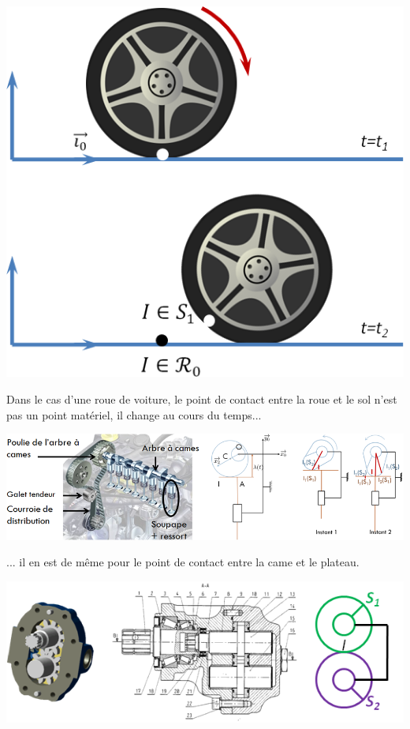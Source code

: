 \documentclass[10pt,oneside]{article}
\begin{document}
\begin{minipage}[c]{.45\linewidth}
\begin{center}
\includegraphics[width=.95\textwidth]{png/ex1}
\end{center}
\end{minipage} \hfill
\begin{minipage}[c]{.5\linewidth}
Dans le cas d'une roue de voiture, le point de contact entre la roue et le sol n'est pas un point matériel, il change au cours du temps...
\end{minipage}
\begin{minipage}[c]{.75\linewidth}
\begin{center}
\includegraphics[width=.95\textwidth]{png/ex2}
\end{center}
\end{minipage} \hfill
\begin{minipage}[c]{.23\linewidth}
... il en est de même pour le point de contact entre la came et le plateau.
\end{minipage}
\begin{minipage}[c]{.75\linewidth}
\begin{center}
\includegraphics[width=.95\textwidth]{png/ex3}
\end{center}
\end{minipage} \hfill
\end{document}
